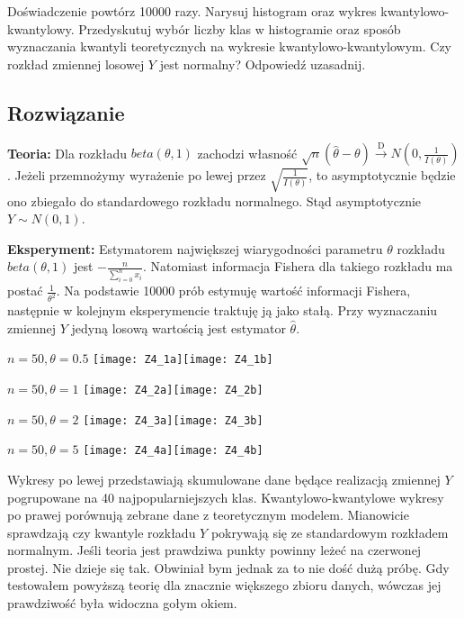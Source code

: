 \documentclass[a4paper]{article}
\begin{document}
Doświadczenie powtórz 10000 razy. Narysuj histogram oraz wykres kwantylowo-kwantylowy. Przedyskutuj wybór liczby klas w histogramie oraz sposób wyznaczania kwantyli teoretycznych na wykresie kwantylowo-kwantylowym. Czy rozkład zmiennej losowej $Y$ jest normalny? Odpowiedź uzasadnij.



\subsection{Rozwiązanie}
\textbf{Teoria:}
Dla rozkładu $beta(\theta,1)$ zachodzi własność $\sqrt{n}(\hat{\theta}-\theta)\xrightarrow{\text{D}}N(0,\frac{1}{I(\theta)})$. Jeżeli przemnożymy wyrażenie po lewej przez $\sqrt{\frac{1}{I(\theta)}}$, to asymptotycznie będzie ono zbiegało do standardowego rozkładu normalnego. Stąd asymptotycznie $Y\sim N(0,1)$.
\newline

\textbf{Eksperyment:}
Estymatorem największej wiarygodności parametru $\theta$ rozkładu $beta(\theta,1)$ jest $-\frac{n}{\sum_{i=0}^nx_i}$. Natomiast informacja Fishera dla takiego rozkładu ma postać $\frac{1}{\theta^2}$. Na podstawie 10000 prób estymuję wartość informacji Fishera, następnie w kolejnym eksperymencie traktuję ją jako stałą. Przy wyznaczaniu zmiennej $Y$ jedyną losową wartością jest estymator $\hat{\theta}$.

\begin{center}
$n=50,\theta=0.5$
\texttt{[image: Z4\_1a]}\texttt{[image: Z4\_1b]} 
\end{center}


\begin{center}
$n=50,\theta=1$
\texttt{[image: Z4\_2a]}\texttt{[image: Z4\_2b]} 
\end{center}
\newpage

\begin{center}
$n=50,\theta=2$
\texttt{[image: Z4\_3a]}\texttt{[image: Z4\_3b]} 
\end{center}

\begin{center}
$n=50,\theta=5$
\texttt{[image: Z4\_4a]}\texttt{[image: Z4\_4b]} 
\end{center}


Wykresy po lewej przedstawiają skumulowane dane będące realizacją zmiennej $Y$ pogrupowane na 40 najpopularniejszych klas. Kwantylowo-kwantylowe wykresy po prawej porównują zebrane dane z teoretycznym modelem. Mianowicie sprawdzają czy kwantyle rozkładu $Y$ pokrywają się ze standardowym rozkładem normalnym. Jeśli teoria jest prawdziwa punkty powinny leżeć na czerwonej prostej. Nie dzieje się tak. Obwiniał bym jednak za to nie dość dużą próbę. Gdy testowałem powyższą teorię dla znacznie większego zbioru danych, wówczas jej prawdziwość była widoczna gołym okiem.
\end{document}
